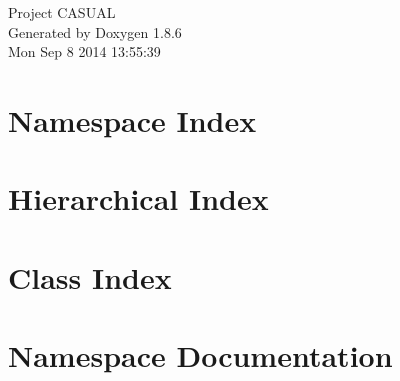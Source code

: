 \documentclass[twoside]{book}
\newcommand{\clearemptydoublepage}{%
  \newpage{\pagestyle{empty}\cleardoublepage}%
}
\begin{document}
\hypersetup{pageanchor=false}
\begin{titlepage}
\vspace*{7cm}
\begin{center}%
{\Large Project C\-A\-S\-U\-A\-L }\\
\vspace*{1cm}
{\large Generated by Doxygen 1.8.6}\\
\vspace*{0.5cm}
{\small Mon Sep 8 2014 13:55:39}\\
\end{center}
\end{titlepage}
\clearemptydoublepage
\tableofcontents
\clearemptydoublepage
{}
\hypersetup{pageanchor=true}

\chapter{Namespace Index}

\chapter{Hierarchical Index}

\chapter{Class Index}

\chapter{Namespace Documentation}




























\end{document}
